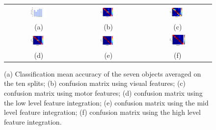 \begin{figure} \centering
  \begin{tabular}{@{}c@{}@{}c@{}@{}c@{}}
    \includegraphics[width=0.25\textwidth]{images/real_.pdf} &
    \includegraphics[width=0.25\textwidth]{images/conf_vis.pdf} &
    \includegraphics[width=0.25\textwidth]{images/conf_mot.pdf} \\
(a) & (b) & (c)\\
    \includegraphics[width=0.25\textwidth]{images/conf_low_real.pdf} &
\includegraphics[width=0.25\textwidth]{images/conf_mck_real.pdf} &
\includegraphics[width=0.25\textwidth]{images/conf_das_real.pdf} \\
    (d) & (e) & (f)\\
  \end{tabular}
  \caption{(a) Classification mean accuracy of the seven objects averaged
    on the ten splits; (b) confusion matrix using visual features; (c) confusion
    matrix using motor features; (d) confusion matrix using the low level
    feature integration; (e) confusion matrix using the mid level
    feature integration; (f) confusion matrix using the high level
    feature integration.}
  \label{fig:real_data}
\end{figure}

